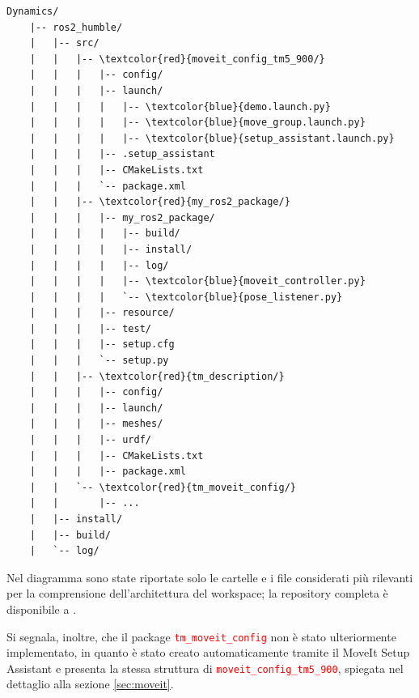 \documentclass[11pt]{report}
\begin{document}
\begin{Verbatim}[commandchars=\\\{\}]
Dynamics/
    |-- ros2_humble/
    |   |-- src/
    |   |   |-- \textcolor{red}{moveit_config_tm5_900/}
    |   |   |   |-- config/
    |   |   |   |-- launch/
    |   |   |   |   |-- \textcolor{blue}{demo.launch.py}
    |   |   |   |   |-- \textcolor{blue}{move_group.launch.py}
    |   |   |   |   |-- \textcolor{blue}{setup_assistant.launch.py}
    |   |   |   |-- .setup_assistant
    |   |   |   |-- CMakeLists.txt
    |   |   |   `-- package.xml
    |   |   |-- \textcolor{red}{my_ros2_package/}
    |   |   |   |-- my_ros2_package/
    |   |   |   |   |-- build/
    |   |   |   |   |-- install/ 
    |   |   |   |   |-- log/
    |   |   |   |   |-- \textcolor{blue}{moveit_controller.py}
    |   |   |   |   `-- \textcolor{blue}{pose_listener.py}  
    |   |   |   |-- resource/
    |   |   |   |-- test/
    |   |   |   |-- setup.cfg
    |   |   |   `-- setup.py
    |   |   |-- \textcolor{red}{tm_description/}
    |   |   |   |-- config/
    |   |   |   |-- launch/  
    |   |   |   |-- meshes/
    |   |   |   |-- urdf/
    |   |   |   |-- CMakeLists.txt
    |   |   |   |-- package.xml
    |   |   `-- \textcolor{red}{tm_moveit_config/}
    |   |       |-- ...
    |   |-- install/
    |   |-- build/
    |   `-- log/
\end{Verbatim}

\newpage

Nel diagramma sono state riportate solo le cartelle e i file considerati più rilevanti per la comprensione dell'architettura del workspace; la repository completa è disponibile a \cite{Repository_ROS2}.

Si segnala, inoltre, che il package \textcolor{red}{\texttt{tm\_moveit\_config}} non è stato ulteriormente implementato, in quanto è stato creato automaticamente tramite il MoveIt Setup Assistant e presenta la stessa struttura di \textcolor{red}{\texttt{moveit\_config\_tm5\_900}}, spiegata nel dettaglio alla sezione \ref{sec:moveit}.
\end{document}

